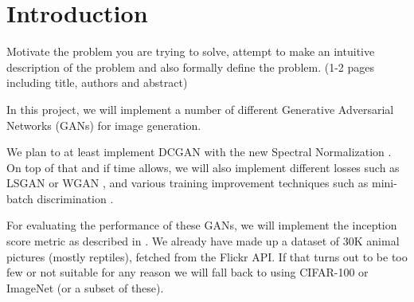 \section{Introduction}
Motivate the problem you are trying to solve, attempt to make an intuitive description of the problem and also formally define the problem. (1-2 pages including title, authors and abstract)


In this project, we will implement a number of different Generative Adversarial Networks (GANs) \cite{goodfellow2014generative} for image generation.
 
 
We plan to at least implement DCGAN \cite{DBLP:journals/corr/RadfordMC15} with the new Spectral Normalization \cite{miyato2018spectral}. On top of that and if time allows, we will also implement different losses such as LSGAN \cite{mao2017least} or WGAN \cite{arjovsky2017wasserstein}, and various training improvement techniques such as mini-batch discrimination \cite{salimans2016improved}. 

For evaluating the performance of these GANs, we will implement the inception score metric as described in \cite{salimans2016improved}. We already have made up a dataset of 30K animal pictures (mostly reptiles), fetched from the Flickr API. If that turns out to be too few or not suitable for any reason we will fall back to using CIFAR-100 or ImageNet (or a subset of these).  
